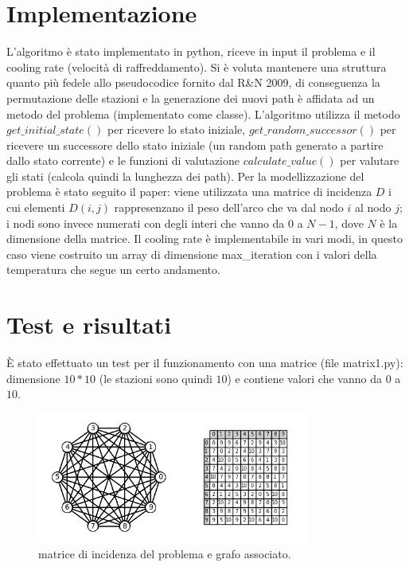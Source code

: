 \documentclass[11pt]{article}
\begin{document}
    \restoregeometry



    \section{Implementazione} \label{sec:implementation}

        L'algoritmo è stato implementato in python, riceve in input il problema e il cooling rate (velocità di raffreddamento).
        Si è voluta mantenere una struttura quanto più fedele allo pseudocodice fornito dal R&N 2009, di conseguenza la permutazione delle stazioni e
        la generazione dei nuovi path è affidata ad un metodo del problema (implementato come classe).
        L'algoritmo utilizza il metodo $get\_initial\_state()$ per ricevere lo stato iniziale, $get\_random\_successor()$ per ricevere un
        successore dello stato iniziale (un random path generato a partire dallo stato corrente) e le funzioni di valutazione $calculate\_value()$
        per valutare gli stati (calcola quindi la lunghezza dei path).
        Per la modellizzazione del problema è stato seguito il paper: viene utilizzata una matrice di incidenza $D$ i cui elementi $D(i,j)$ rappresenzano il
        peso dell'arco che va dal nodo $i$ al nodo $j$; i nodi sono invece numerati con degli interi che vanno da $0$ a $N-1$, dove $N$ è la dimensione della matrice.
        Il cooling rate è implementabile in vari modi, in questo caso viene costruito un array di dimensione max\_iteration con i valori della temperatura che
        segue un certo andamento.

    \section{Test e risultati} \label{sec:test_and_results}

        È stato effettuato un test per il funzionamento con una matrice (file matrix1.py): dimensione $10*10$ (le stazioni sono quindi $10$) e
        contiene valori che vanno da $0$ a $10$.

        \begin{figure}[h]
            \centering
            \includegraphics[width=0.8\textwidth]{matrix1}
            \caption{matrice di incidenza del problema e grafo associato.}
            \label{fig:matrix1}
        \end{figure}
\end{document}
